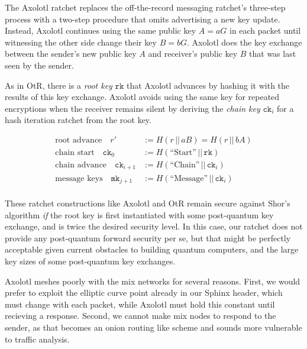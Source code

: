 \documentclass[twoside,letterpaper]{llncs}
\def\mathcomma{}
\begin{document}

\def\ck{\texttt{ck}}
\def\rk{\texttt{rk}}
\def\mk{\texttt{mk}}

The Axolotl ratchet \cite{TextSecure} replaces the off-the-record
messaging ratchet's three-step process with a two-step procedure
that omits advertising a new key update.  Instead, Axolotl continues
using the same public key $A = a G$ in each packet until witnessing
the other side change their key $B = b G$.  Axolotl does the key
exchange between the sender's new public key $A$ and receiver's
public key $B$ that was last seen by the sender.

As in OtR, there is a {\it root key} $\rk$ that Axolotl advances by
hashing it with the results of this key exchange.  Axolotl avoids using the same key for
repeated encryptions when the receiver remains silent by deriving the
{\it chain key} $\ck_i$ for a hash iteration ratchet from the root key.

\[ \begin{aligned}
\textrm{root advance}\quad
r' &:= H(r \,||\, a B) = H(r \,||\, b A) \\ %
\textrm{chain start}\quad
 \ck_0 &:= H(\textrm{``Start''} \,||\, \rk) \\
\textrm{chain advance}\quad
 \ck_{i+1} &:= H(\textrm{``Chain''} \,||\, \ck_i)  \\
\textrm{message keys}\quad
 \mk_{j+1} &:= H(\textrm{``Message''} \,||\, \ck_i)  \\
\end{aligned} \]

These ratchet constructions like Axolotl and OtR remain secure against
Shor's algorithm {\it if} the root key is first instantiated with some
post-quantum key exchange, and is twice the desired security level. 
In this case, our ratchet does not provide any post-quantum forward
security per se, but that might be perfectly acceptable given current
obstacles to building quantum computers, and the large key sizes of
some post-quantum key exchanges. 


Axolotl meshes poorly with the mix networks for several reasons.
%
First, we would prefer to exploit the elliptic curve point
 already in our Sphinx header, which must change with each packet,
while Axolotl must hold this constant until recieving a response.
%
Second, we cannot make mix nodes to respond to the sender, as that
becomes an onion routing like scheme and sounds more vulnerable to
traffic analysis.

\def\cn{\texttt{cn}}
\def\DH{\texttt{DH}}
\def\lk{\texttt{lk}}
\def\sk{\texttt{sk}}
\def\ECDH{\textrm{ECDH}}
\end{document}
